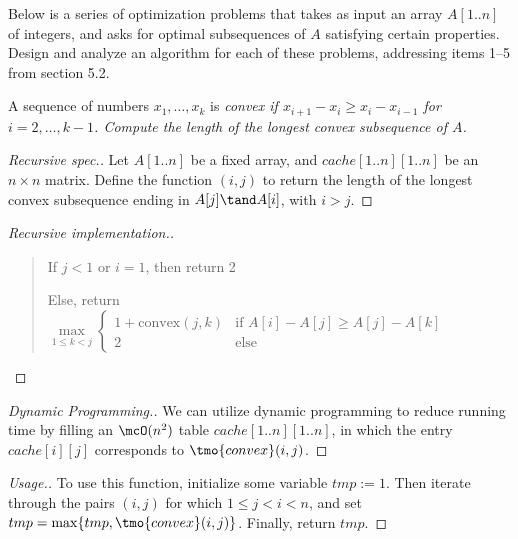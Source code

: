 \documentclass{article}
\begin{document}
 Below is a series of optimization problems that takes as input an array \( A[1..n] \) of integers, and asks for optimal subsequences of \( A \) satisfying certain properties. Design and analyze an algorithm for each of these problems, addressing items 1--5 from section 5.2.
\setcounter{section}{5}
\setcounter{exercise}{1}
\setcounter{subexercise}{1}
\begin{subexercise}
  A sequence of numbers \( x_1,\ldots,x_k \) is \it{convex} if \( x_{i+1}-x_i \geq x_i-x_{i-1} \) for \( i=2,\ldots,k-1 \). Compute the length of the longest convex subsequence of \( A \).
\end{subexercise}

\begin{proof}[Recursive spec.]
Let \( A[1..n] \) be a fixed array, and \( cache[1..n][1..n] \) be an \( n\times n \) matrix. Define the function \( (i,j) \) to return the length of the longest convex subsequence ending in \( A[j]\tand A[i] \), with \( i>j \).
\end{proof}

\begin{proof}[Recursive implementation.]\
\begin{quote}
\begin{steps}
  \item If \( j < 1 \) or \( i = 1 \), then return 2
  \item Else, return $ \max\limits_{1\leq k < j}
  \begin{cases}
    1 + \text{convex}(j, k) & \text{if } A[i] - A[j] \geq A[j] - A[k] \\
    2 & \text{else}
  \end{cases} $
\end{steps}
\end{quote}
\end{proof}

\begin{proof}[Dynamic Programming.]
 We can utilize dynamic programming to reduce running time by filling an \( \mcO(n^2) \) table \( cache[1..n][1..n] \), in which the entry \( cache[i][j] \) corresponds to \( \tmo{convex}(i,j) \).
\end{proof}

\begin{proof}[Usage.]
  To use this function, initialize some variable \( tmp := 1 \). Then iterate through the pairs \( (i,j) \) for which \( 1 \leq j < i < n \), and set \( tmp = \max\{tmp, \tmo{convex}(i,j)\} \). Finally, return \( tmp \).
\end{proof}
\end{document}
